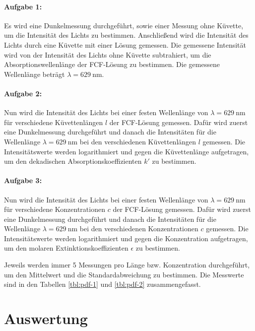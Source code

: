 \documentclass[12pt,a4paper,titlepage]{scrartcl}
\numberwithin{equation}{section}
\numberwithin{table}{section}
\numberwithin{figure}{section}
\begin{document}
\paragraph{Aufgabe 1:}
Es wird eine Dunkelmessung durchgeführt, sowie einer Messung ohne Küvette, um die Intensität des Lichts zu bestimmen. Anschließend wird die Intensität des Lichts durch eine Küvette mit einer Lösung gemessen. Die gemessene Intensität wird von der Intensität des Lichts ohne Küvette subtrahiert, um die Absorptionswellenlänge der FCF-Lösung zu bestimmen. Die gemessene Wellenlänge beträgt $\lambda = \SI{629}{\nano\meter}$.

\paragraph{Aufgabe 2:}
Nun wird die Intensität des Lichts bei einer festen Wellenlänge von $\lambda = \SI{629}{\nano\meter}$ für verschiedene Küvettenlängen $l$ der FCF-Lösung gemessen. Dafür wird zuerst eine Dunkelmessung durchgeführt und danach die Intensitäten für die Wellenlänge $\lambda = \SI{629}{\nano\meter}$ bei den verschiedenen Küvettenlängen $l$ gemessen. Die Intensitätswerte werden logarithmiert und gegen die Küvettenlänge aufgetragen, um den dekadischen Absorptionskoeffizienten $k'$ zu bestimmen.

\paragraph{Aufgabe 3:}
Nun wird die Intensität des Lichts bei einer festen Wellenlänge von $\lambda = \SI{629}{\nano\meter}$ für verschiedene Konzentrationen $c$ der FCF-Lösung gemessen. Dafür wird zuerst eine Dunkelmessung durchgeführt und danach die Intensitäten für die Wellenlänge $\lambda = \SI{629}{\nano\meter}$ bei den verschiedenen Konzentrationen $c$ gemessen. Die Intensitätswerte werden logarithmiert und gegen die Konzentration aufgetragen, um den molaren Extinktionskoeffizienten $\epsilon$ zu bestimmen. 

Jeweils werden immer 5 Messungen pro Länge bzw. Konzentration durchgeführt, um den Mittelwert und die Standardabweichung zu bestimmen. Die Messwerte sind in den Tabellen \ref{tbl:pdf-1} und \ref{tbl:pdf-2} zusammengefasst.


\section{Auswertung}
\end{document}
